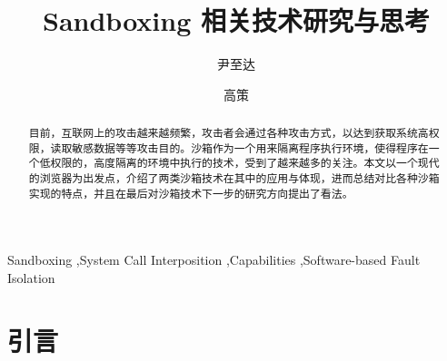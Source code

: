 \documentclass[final,12pt]{elsarticle}
\begin{document}
\begin{frontmatter}



\title{Sandboxing 相关技术研究与思考}


\author{尹至达}
\author{高策}

\address{上海交通大学软件学院}

\begin{abstract}

目前，互联网上的攻击越来越频繁，攻击者会通过各种攻击方式，以达到获取系统高权限，读取敏感数据等等攻击目的。沙箱作为一个用来隔离程序执行环境，使得程序在一个低权限的，高度隔离的环境中执行的技术，受到了越来越多的关注。本文以一个现代的浏览器为出发点，介绍了两类沙箱技术在其中的应用与体现，进而总结对比各种沙箱实现的特点，并且在最后对沙箱技术下一步的研究方向提出了看法。

\end{abstract}

\begin{keyword}

Sandboxing \sep System Call Interposition \sep Capabilities \sep Software-based Fault Isolation

\end{keyword}

\end{frontmatter}


\section{引言}
\label{s:introduction}
\end{document}
